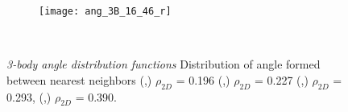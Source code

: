 \documentclass[12pt]{article}
\begin{document}
\begin{figure}[h!]
   \begin{subfigure}[b]{0.15\textwidth}
    \texttt{[image: ang\_3B\_16\_46\_r]}
     \vspace{-15pt} \caption{}
    \label{fig:ang_16_r}
  \end{subfigure}\\
	\caption{\textit{3-body angle distribution functions} Distribution of angle formed between nearest neighbors  (\protect{},\protect{})  \(\rho_{2D}\) = 0.196 (\protect{},\protect{}) \(\rho_{2D}\) = 0.227 (\protect{},\protect{}) \(\rho_{2D}\) = 0.293, (\protect{},\protect{}) \(\rho_{2D}\) = 0.390.}
	\label{fig:3body_angle_dist_2}
\end{figure}
\end{document}
